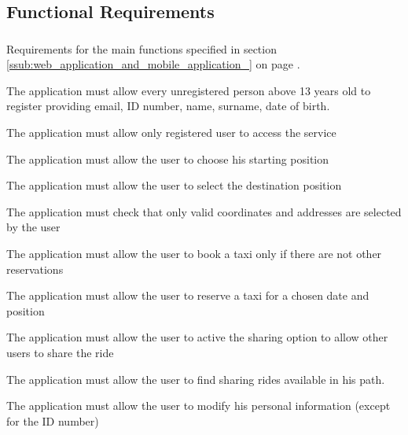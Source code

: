 
\subsection{Functional Requirements} %
\label{sec:functionalrequirement}
\subsubsection{}
Requirements for the main functions specified in section \ref{ssub:web_application_and_mobile_application_} on page \pageref{ssub:web_application_and_mobile_application_}.
\begin{enumerate}[label = \textbf{[FR\arabic*]}]
	\item The application must allow every unregistered person above 13 years old to register providing email, ID number, name, surname, date of birth.
	\item The application must allow only registered user to access the service
	\item The application must allow the user to choose his starting position
	\item The application must allow the user to select the destination position
	\item The application must check that only valid coordinates and addresses  are selected by the user
	\item The application must allow the user to book a taxi only if there are not other reservations
	\item The application must allow the user to reserve a taxi for a chosen  date and position
	\item The application must allow the user to active the sharing option to allow other users to share the ride
	\item The application must allow the user to find sharing rides available in his path.
	\item The application must allow the user to modify his personal information (except for the ID number)	 
\end{enumerate}


